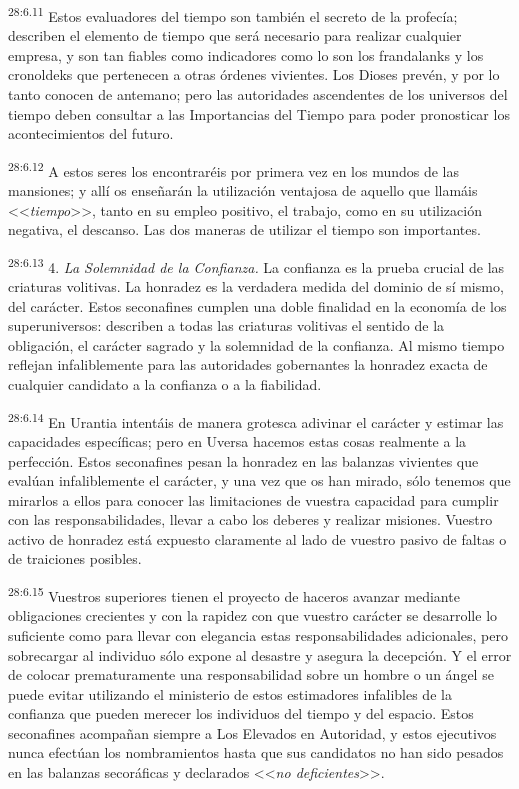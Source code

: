 \par
\textsuperscript{28:6.11} Estos evaluadores del tiempo son también el secreto de la profecía; describen el elemento de tiempo que será necesario para realizar cualquier empresa, y son tan fiables como indicadores como lo son los frandalanks y los cronoldeks que pertenecen a otras órdenes vivientes. Los Dioses prevén, y por lo tanto conocen de antemano; pero las autoridades ascendentes de los universos del tiempo deben consultar a las Importancias del Tiempo para poder pronosticar los acontecimientos del futuro.

\par
\textsuperscript{28:6.12} A estos seres los encontraréis por primera vez en los mundos de las mansiones; y allí os enseñarán la utilización ventajosa de aquello que llamáis <<\textit{tiempo}>>, tanto en su empleo positivo, el trabajo, como en su utilización negativa, el descanso. Las dos maneras de utilizar el tiempo son importantes.

\par
\textsuperscript{28:6.13} 4. \textit{La Solemnidad de la Confianza.} La confianza es la prueba crucial de las criaturas volitivas. La honradez es la verdadera medida del dominio de sí mismo, del carácter. Estos seconafines cumplen una doble finalidad en la economía de los superuniversos: describen a todas las criaturas volitivas el sentido de la obligación, el carácter sagrado y la solemnidad de la confianza. Al mismo tiempo reflejan infaliblemente para las autoridades gobernantes la honradez exacta de cualquier candidato a la confianza o a la fiabilidad.

\par
\textsuperscript{28:6.14} En Urantia intentáis de manera grotesca adivinar el carácter y estimar las capacidades específicas; pero en Uversa hacemos estas cosas realmente a la perfección. Estos seconafines pesan la honradez en las balanzas vivientes que evalúan infaliblemente el carácter, y una vez que os han mirado, sólo tenemos que mirarlos a ellos para conocer las limitaciones de vuestra capacidad para cumplir con las responsabilidades, llevar a cabo los deberes y realizar misiones. Vuestro activo de honradez está expuesto claramente al lado de vuestro pasivo de faltas o de traiciones posibles.

\par
\textsuperscript{28:6.15} Vuestros superiores tienen el proyecto de haceros avanzar mediante obligaciones crecientes y con la rapidez con que vuestro carácter se desarrolle lo suficiente como para llevar con elegancia estas responsabilidades adicionales, pero sobrecargar al individuo sólo expone al desastre y asegura la decepción. Y el error de colocar prematuramente una responsabilidad sobre un hombre o un ángel se puede evitar utilizando el ministerio de estos estimadores infalibles de la confianza que pueden merecer los individuos del tiempo y del espacio. Estos seconafines acompañan siempre a Los Elevados en Autoridad, y estos ejecutivos nunca efectúan los nombramientos hasta que sus candidatos no han sido pesados en las balanzas secoráficas y declarados <<\textit{no deficientes}>>.


